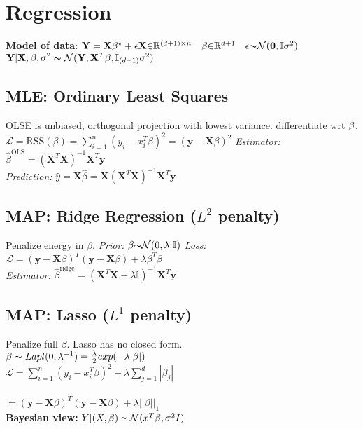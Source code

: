 \section*{Regression}
\textbf{Model of data}:
$\mathbf{Y}=\mathbf{X}\beta^\star +\epsilon \\
\mathbf{X}{\in}\mathbb{R}^{(d{+}1){\times} n} \quad \beta {\in} \mathbb{R}^{d{+}1} \quad \epsilon {\thicksim} \mathcal{N}(\mathbf{0},\mathbb{I}\sigma^2)$\\
$\mathbf{Y}|\mathbf{X},\beta, \sigma^2 \thicksim \mathcal{N}(\mathbf{Y}; \mathbf{X}^T\beta, \mathbb{I}_{(d+1)}\sigma^2)$



\subsection*{MLE: Ordinary Least Squares}
OLSE is unbiased, orthogonal projection with lowest variance. differentiate wrt $\beta$.\\
$\mathcal{L} {=} \text{RSS}(\beta){=}\sum_{i{=}1}^n(y_i{-}x_i^T\beta)^2{=}(\mathbf{y}{-}\mathbf{X}\beta)^2$
\textit{Estimator:} \ $\hat{\beta}^\text{OLS} = (\mathbf{X}^T\mathbf{X})^{-1}\mathbf{X}^{T}\mathbf{y}$\\
\textit{Prediction:} $\hat{y}{=}\mathbf{X}\hat{\beta}{=}\mathbf{X}(\mathbf{X}^T\mathbf{X})^{-1}\mathbf{X}^{T}\mathbf{y}$


\subsection*{MAP: Ridge Regression ($L^2$ penalty)}
Penalize energy in $\beta$. \textit{Prior:} $\beta{\thicksim}\mathcal{N}(0, \lambda^{\text{-}}\mathbb{I})$
\textit{Loss:} $\mathcal{L} = (\mathbf{y}-\mathbf{X}\beta)^T(\mathbf{y}-\mathbf{X}\beta)+\lambda\beta^T\beta$\\
\textit{Estimator:} $\hat{\beta}^\text{ridge} = (\mathbf{X}^T\mathbf{X}+\lambda\mathbb{I})^{-1}\mathbf{X}^{T}\mathbf{y}$ \\

\subsection*{MAP: Lasso ($L^1$ penalty)}
Penalize full $\beta$. Lasso has no closed form.\\
$\beta \thicksim Lapl(0, \lambda^{-1}) = \frac{\lambda}{2} exp(-\lambda |\beta|)$ \\
$\mathcal{L} = \sum_{i=1}^n(y_i-x_i^T\beta)^2+\lambda\sum_{j=1}^d|\beta_j| $\\\\
$=(\mathbf{y}-\mathbf{X}\beta)^T(\mathbf{y}-\mathbf{X}\beta)+\lambda||\beta||_1$\\
\textbf{Bayesian view:} $Y|(X, \beta) \smallsim \mathcal{N}(x^T\beta, \sigma^2 I)$\\

